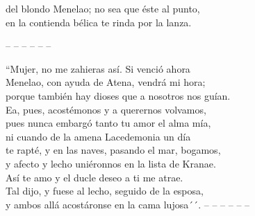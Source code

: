 \documentclass[11pt,twoside]{article}
\begin{document}
del blondo Menelao; no sea que éste al punto,\\
en la contienda bélica te rinda por la lanza.\par
\pend
%
\noindent-- -- -- -- -- --\par
%
\pstart
{}``Mujer, no me zahieras así. Si venció ahora\\
Menelao, con ayuda de Atena, vendrá mi hora;\\
porque también hay dioses que a nosotros nos guían.\\
Ea, pues, acostémonos y a querernos volvamos,\\
pues nunca embargó tanto tu amor el alma mía,\\
ni cuando de la amena Lacedemonia un día\\
te rapté, y en las naves, pasando el mar, bogamos,\\
y afecto y lecho uniéronnos en la lista de Kranae.\\
Así te amo y el ducle deseo a ti me atrae.\\
Tal dijo, y fuese al lecho, seguido de la esposa,\\
y ambos allá acostáronse en la cama lujosa´´.
\pend
%
\noindent-- -- -- -- -- --\par
%
\endnumbering
\newpage
%
\end{document}
